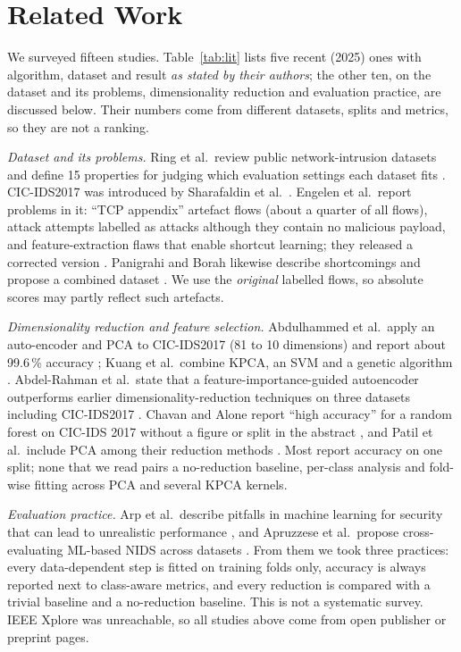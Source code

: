 \documentclass[runningheads]{llncs}
\begin{document}
\section{Related Work}
We surveyed fifteen studies. Table~\ref{tab:lit} lists five recent (2025) ones with algorithm, dataset and result \emph{as stated by their authors}; the other ten, on the dataset and its problems, dimensionality reduction and evaluation practice, are discussed below. Their numbers come from different datasets, splits and metrics, so they are not a ranking.


\textit{Dataset and its problems.} Ring et al.\ review public network-intrusion datasets and define 15 properties for judging which evaluation settings each dataset fits \cite{ring2019}. CIC-IDS2017 was introduced by Sharafaldin et al.\ \cite{sharafaldin2018}. Engelen et al.\ report problems in it: ``TCP appendix'' artefact flows (about a quarter of all flows), attack attempts labelled as attacks although they contain no malicious payload, and feature-extraction flaws that enable shortcut learning; they released a corrected version \cite{engelen2021}. Panigrahi and Borah likewise describe shortcomings and propose a combined dataset \cite{panigrahi2018}. We use the \emph{original} labelled flows, so absolute scores may partly reflect such artefacts.

\textit{Dimensionality reduction and feature selection.} Abdulhammed et al.\ apply an auto-encoder and PCA to CIC-IDS2017 (81 to 10 dimensions) and report about 99.6\,\% accuracy \cite{abdulhammed2019}; Kuang et al.\ combine KPCA, an SVM and a genetic algorithm \cite{kuang2014}. Abdel-Rahman et al.\ state that a feature-importance-guided autoencoder outperforms earlier dimensionality-reduction techniques on three datasets including CIC-IDS2017 \cite{abdelrahman2026}. Chavan and Alone report ``high accuracy'' for a random forest on CIC-IDS 2017 without a figure or split in the abstract \cite{chavan2025}, and Patil et al.\ include PCA among their reduction methods \cite{patil2025}. Most report accuracy on one split; none that we read pairs a no-reduction baseline, per-class analysis and fold-wise fitting across PCA and several KPCA kernels.

\textit{Evaluation practice.} Arp et al.\ describe pitfalls in machine learning for security that can lead to unrealistic performance \cite{arp2022}, and Apruzzese et al.\ propose cross-evaluating ML-based NIDS across datasets \cite{apruzzese2022}. From them we took three practices: every data-dependent step is fitted on training folds only, accuracy is always reported next to class-aware metrics, and every reduction is compared with a trivial baseline and a no-reduction baseline. This is not a systematic survey. IEEE Xplore was unreachable, so all studies above come from open publisher or preprint pages.
\end{document}

